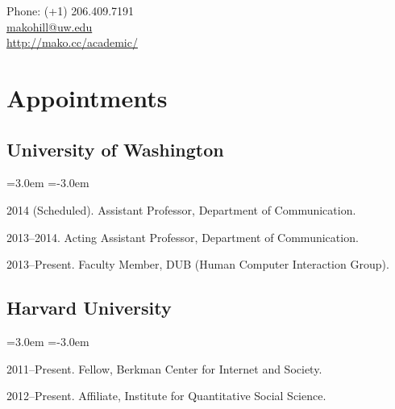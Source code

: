 \documentclass[10pt]{article}
\makeatletter
\def\myemail{makohill@uw.edu}
\def\myweb{http://mako.cc/academic/}
\newenvironment{cvlist}{
\begin{list}{}{\leftmargin=3.0em \itemindent=-3.0em}
  \setlength{\itemsep}{0pt}
  \setlength{\parskip}{0em}
  \setlength{\parsep}{1em}
  \setlength{\parindent}{0em}}
{\vspace{1em}
\end{list}}
\makeatother
\begin{document}
\pagestyle{fancy}
\renewcommand{\headrulewidth}{0pt}
\fancyhead{}
\fancyfoot{}
\rhead{{\scriptsize\thepage}}


\begin{minipage}[t]{3in}
  
\end{minipage}
\hfill     
\begin{minipage}[t]{0.0in}
\end{minipage}
\hfill
\begin{minipage}[t]{1.7in}
  \flushright \footnotesize Phone: (+1) 206.409.7191 \\ 
  \href{mailto:\myemail}{\myemail} \\
  \href{\myweb}{\myweb}
\end{minipage}

\vspace{2em}


\medskip

\section{Appointments}

\subsection{University of Washington}
\begin{cvlist}
\item 2014 (Scheduled). Assistant Professor, Department of Communication.
\item 2013--2014. Acting Assistant Professor, Department of Communication.
\item 2013--Present. Faculty Member, DUB (Human Computer Interaction Group).
\end{cvlist}

\subsection{Harvard University}
\begin{cvlist}
\item 2011--Present. Fellow, Berkman Center for Internet and Society.
\item 2012--Present. Affiliate, Institute for Quantitative Social Science.
\end{cvlist}
\end{document}
